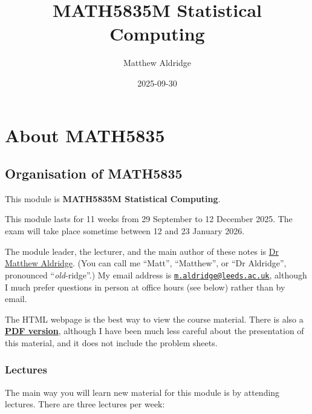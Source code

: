 \documentclass[
  letterpaper,
  DIV=11,
  numbers=noendperiod]{scrreprt}
\title{MATH5835M Statistical Computing}
\author{Matthew Aldridge}
\date{2025-09-30}
\renewcommand*\contentsname{Table of contents}
\newcommand\contentsname{Table of contents}
\theoremstyle{plain}
\theoremstyle{definition}
\theoremstyle{definition}
\theoremstyle{remark}
\begin{document}
\maketitle

\renewcommand*\contentsname{Table of contents}
{
\hypersetup{linkcolor=}
\setcounter{tocdepth}{2}
\tableofcontents
}


\chapter*{About MATH5835}\label{about-math5835}


\section*{Organisation of MATH5835}\label{organisation-of-math5835}


This module is \textbf{MATH5835M Statistical Computing}.

This module lasts for 11 weeks from 29 September to 12 December 2025.
The exam will take place sometime between 12 and 23 January 2026.

The module leader, the lecturer, and the main author of these notes is
\href{https://mpaldridge.github.io/}{Dr Matthew Aldridge}. (You can call
me ``Matt'', ``Matthew'', or ``Dr Aldridge'', pronounced
``\emph{old}-ridge''.) My email address is
\href{mailto:m.aldridge@leeds.ac.uk}{\nolinkurl{m.aldridge@leeds.ac.uk}},
although I much prefer questions in person at office hours (see below)
rather than by email.

The HTML webpage is the best way to view the course material. There is
also a \href{MATH5835M-Statistical-Computing.pdf}{\textbf{PDF version}},
although I have been much less careful about the presentation of this
material, and it does not include the problem sheets.

\subsection*{Lectures}\label{lectures}

The main way you will learn new material for this module is by attending
lectures. There are three lectures per week:
\end{document}
